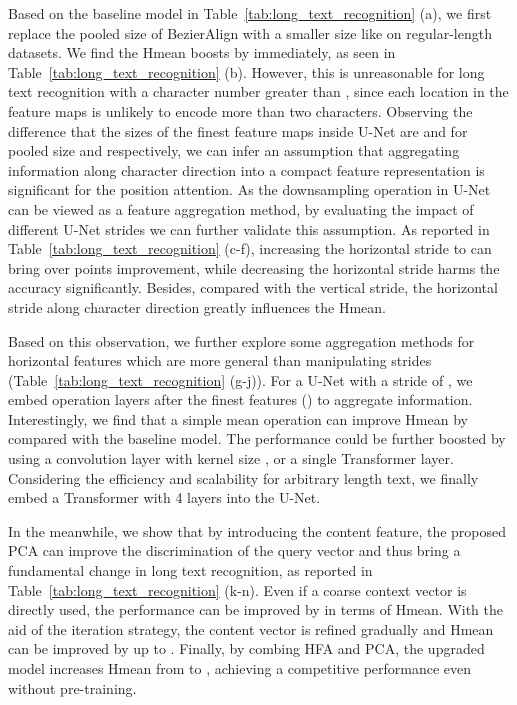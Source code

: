 \documentclass[10pt,journal,compsoc]{IEEEtran}
\begin{document}
Based on the baseline model in Table~\ref{tab:long_text_recognition} (a), we first replace the pooled size of BezierAlign with a smaller size  like on regular-length datasets. We find the Hmean boosts by  immediately, as seen in Table~\ref{tab:long_text_recognition} (b). However, this is unreasonable for long text recognition with a character number greater than , since each location in the feature maps is unlikely to encode more than two characters. Observing the difference that the sizes of the finest feature maps inside U-Net are  and  for pooled size   and  respectively, we can infer an assumption that aggregating information along character direction into a compact feature representation is significant for the position attention. As the downsampling operation in U-Net can be viewed as a feature aggregation method, by evaluating the impact of different U-Net strides we can further validate this assumption. As reported in Table~\ref{tab:long_text_recognition} (c-f), increasing the horizontal stride to  can bring over  points improvement, while decreasing the horizontal stride harms the accuracy significantly. Besides, compared with the vertical stride, the horizontal stride along character direction greatly influences the Hmean.

Based on this observation, we further explore some aggregation methods for horizontal features which are more general than manipulating strides (Table~\ref{tab:long_text_recognition} (g-j)). For a U-Net with a stride of , we embed operation layers after the finest features () to aggregate information. Interestingly, we find that a simple mean operation can improve Hmean by  compared with the baseline model. The performance could be further boosted by using a convolution layer with kernel size , or a single Transformer layer. Considering the efficiency and scalability for arbitrary length text, we finally embed a Transformer with 4 layers into the U-Net.

In the meanwhile, we show that by introducing the content feature, the proposed PCA can improve the discrimination of the query vector and thus bring a fundamental change in long text recognition, as reported in Table~\ref{tab:long_text_recognition} (k-n). Even if a coarse context vector is directly used, the performance can be improved by  in terms of Hmean. With the aid of the iteration strategy, the content vector is refined gradually and Hmean can be improved by up to . Finally, by combing HFA and PCA, the upgraded model increases Hmean from  to , achieving a competitive performance even without pre-training.
\end{document}
